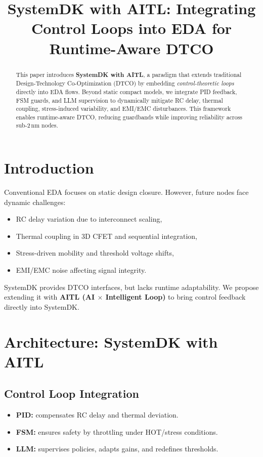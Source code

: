 \documentclass[conference]{IEEEtran}
\title{SystemDK with AITL: Integrating Control Loops into EDA for Runtime-Aware DTCO}
\author{
  \IEEEauthorblockN{Shinichi Samizo}
  \IEEEauthorblockA{Independent Semiconductor Researcher\\
  Email: \href{mailto:shin3t72@gmail.com}{shin3t72@gmail.com}}
}
\begin{document}
\maketitle

\begin{abstract}
This paper introduces \textbf{SystemDK with AITL}, a paradigm that extends 
traditional Design-Technology Co-Optimization (DTCO) by embedding 
\emph{control-theoretic loops} directly into EDA flows. 
Beyond static compact models, we integrate PID feedback, FSM guards, 
and LLM supervision to dynamically mitigate RC delay, thermal coupling, 
stress-induced variability, and EMI/EMC disturbances. 
This framework enables runtime-aware DTCO, reducing guardbands while 
improving reliability across sub-2\,nm nodes.
\end{abstract}

\section{Introduction}
Conventional EDA focuses on static design closure. 
However, future nodes face dynamic challenges: 
\begin{itemize}
  \item RC delay variation due to interconnect scaling,
  \item Thermal coupling in 3D CFET and sequential integration,
  \item Stress-driven mobility and threshold voltage shifts,
  \item EMI/EMC noise affecting signal integrity.
\end{itemize}
SystemDK provides DTCO interfaces, but lacks runtime adaptability.
We propose extending it with \textbf{AITL (AI $\times$ Intelligent Loop)} 
to bring control feedback directly into SystemDK.

\section{Architecture: SystemDK with AITL}
\subsection{Control Loop Integration}
\begin{itemize}
  \item \textbf{PID:} compensates RC delay and thermal deviation.
  \item \textbf{FSM:} ensures safety by throttling under HOT/stress conditions.
  \item \textbf{LLM:} supervises policies, adapts gains, and redefines thresholds.
\end{itemize}
\end{document}
